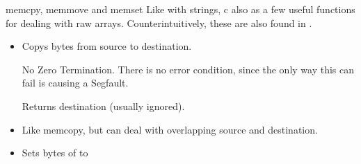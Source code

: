 \documentclass[10pt,graphics,aspectratio=169,table]{beamer}
\begin{document}
\begin{frame}[fragile]{memcpy, memmove and memset}
    Like with strings, c also as a few useful functions for dealing with raw
    arrays. Counterintuitively, these are also found in .
    \begin{itemize}
        \item {}
    
        Copys  bytes from source to destination.
        
        No Zero Termination. There is no error condition,
        since the only way this can fail is causing a Segfault.
        
        Returns destination (usually ignored).
    
        \item {}
    
        Like memcopy, but can deal with overlapping source and destination.

        \item  {}
        
        Sets  bytes of  to 
    \end{itemize}
\end{frame}
\end{document}
